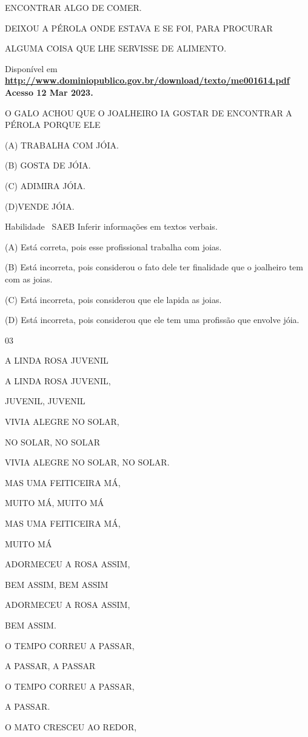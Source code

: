 {{ENCONTRAR ALGO DE COMER.

DEIXOU A PÉROLA ONDE ESTAVA E SE FOI, PARA PROCURAR

ALGUMA COISA QUE LHE SERVISSE DE ALIMENTO.

Disponível em
\textbf{\url{http://www.dominiopublico.gov.br/download/texto/me001614.pdf}
Acesso 12 Mar 2023.}

O GALO ACHOU QUE O JOALHEIRO IA GOSTAR DE ENCONTRAR A PÉROLA PORQUE ELE

(A) TRABALHA COM JÓIA.

(B) GOSTA DE JÓIA.

(C) ADIMIRA JÓIA.

(D)VENDE JÓIA.

\protect\hypertarget{_Hlk129237824}{}{}Habilidade ~SAEB Inferir
informações em textos verbais.

\protect\hypertarget{_Hlk129241484}{}{}(A) Está correta, pois esse
profissional trabalha com joias.

(B) Está incorreta, pois considerou o fato dele ter finalidade que o
joalheiro tem com as joias.

(C) Está incorreta, pois considerou que ele lapida as joias.

(D) Está incorreta, pois considerou que ele tem uma profissão que
envolve jóia.

\num{03}

A LINDA ROSA JUVENIL

A LINDA ROSA JUVENIL,

JUVENIL, JUVENIL

VIVIA ALEGRE NO SOLAR,

NO SOLAR, NO SOLAR

VIVIA ALEGRE NO SOLAR, NO SOLAR.

MAS UMA FEITICEIRA MÁ,

MUITO MÁ, MUITO MÁ

MAS UMA FEITICEIRA MÁ,

MUITO MÁ

ADORMECEU A ROSA ASSIM,

BEM ASSIM, BEM ASSIM

ADORMECEU A ROSA ASSIM,

BEM ASSIM.

O TEMPO CORREU A PASSAR,

A PASSAR, A PASSAR

O TEMPO CORREU A PASSAR,

A PASSAR.

O MATO CRESCEU AO REDOR,

}}
